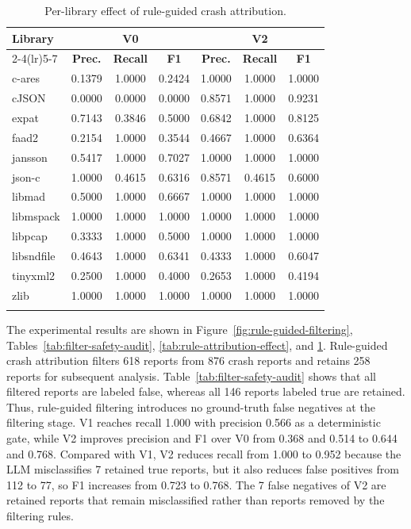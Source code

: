 \documentclass[pdflatex,sn-basic]{sn-jnl}%
\renewcommand{\arraystretch}{1.16}%
\theoremstyle{thmstyleone}%
\theoremstyle{thmstyletwo}%
\theoremstyle{thmstylethree}%
\begin{document}
\begin{table}[ht]
\caption{Per-library effect of rule-guided crash attribution.}
\label{tab:per-library-rule-attribution}
\centering
\scriptsize
\setlength{\tabcolsep}{2.2pt}
\renewcommand{\arraystretch}{1.08}
\begin{tabular*}{\linewidth}{@{\extracolsep{\fill}}lcccccc}
\toprule
\textbf{Library} & \multicolumn{3}{c}{\textbf{V0}} & \multicolumn{3}{c}{\textbf{V2}} \\
\cmidrule(lr){2-4}\cmidrule(lr){5-7}
& \textbf{Prec.} & \textbf{Recall} & \textbf{F1} & \textbf{Prec.} & \textbf{Recall} & \textbf{F1} \\
\midrule
c-ares & 0.1379 & 1.0000 & 0.2424 & 1.0000 & 1.0000 & 1.0000 \\
cJSON & 0.0000 & 0.0000 & 0.0000 & 0.8571 & 1.0000 & 0.9231 \\
expat & 0.7143 & 0.3846 & 0.5000 & 0.6842 & 1.0000 & 0.8125 \\
faad2 & 0.2154 & 1.0000 & 0.3544 & 0.4667 & 1.0000 & 0.6364 \\
jansson & 0.5417 & 1.0000 & 0.7027 & 1.0000 & 1.0000 & 1.0000 \\
json-c & 1.0000 & 0.4615 & 0.6316 & 0.8571 & 0.4615 & 0.6000 \\
libmad & 0.5000 & 1.0000 & 0.6667 & 1.0000 & 1.0000 & 1.0000 \\
libmspack & 1.0000 & 1.0000 & 1.0000 & 1.0000 & 1.0000 & 1.0000 \\
libpcap & 0.3333 & 1.0000 & 0.5000 & 1.0000 & 1.0000 & 1.0000 \\
libsndfile & 0.4643 & 1.0000 & 0.6341 & 0.4333 & 1.0000 & 0.6047 \\
tinyxml2 & 0.2500 & 1.0000 & 0.4000 & 0.2653 & 1.0000 & 0.4194 \\
zlib & 1.0000 & 1.0000 & 1.0000 & 1.0000 & 1.0000 & 1.0000 \\
\botrule
\end{tabular*}
\end{table}

The experimental results are shown in Figure~\ref{fig:rule-guided-filtering}, Tables~\ref{tab:filter-safety-audit}, \ref{tab:rule-attribution-effect}, and \ref{tab:per-library-rule-attribution}. Rule-guided crash attribution filters 618 reports from 876 crash reports and retains 258 reports for subsequent analysis. Table~\ref{tab:filter-safety-audit} shows that all filtered reports are labeled false, whereas all 146 reports labeled true are retained. Thus, rule-guided filtering introduces no ground-truth false negatives at the filtering stage. V1 reaches recall 1.000 with precision 0.566 as a deterministic gate, while V2 improves precision and F1 over V0 from 0.368 and 0.514 to 0.644 and 0.768. Compared with V1, V2 reduces recall from 1.000 to 0.952 because the LLM misclassifies 7 retained true reports, but it also reduces false positives from 112 to 77, so F1 increases from 0.723 to 0.768. The 7 false negatives of V2 are retained reports that remain misclassified rather than reports removed by the filtering rules.
\end{document}
